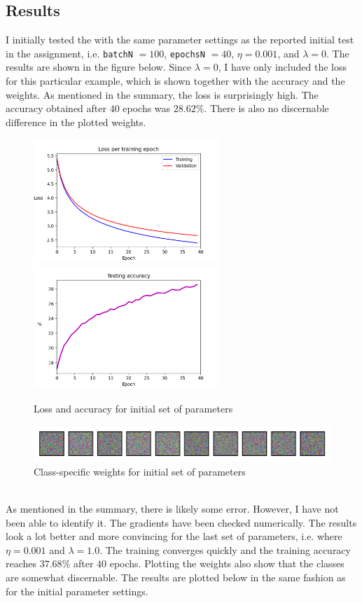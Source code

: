 \documentclass{article}
\begin{document}
\subsection*{Results}
	I initially tested the with the same parameter settings as the reported initial test in the assignment, i.e. \texttt{batchN} $=100$, \texttt{epochsN} $=40$, $\eta = 0.001$, and $\lambda = 0$. The results are shown in the figure below. Since $\lambda=0$, I have only included the loss for this particular example, which is shown together with the accuracy and the weights. As mentioned in the summary, the loss is surprisingly high. The accuracy obtained after $40$ epochs was $28.62$\%. There is also no discernable difference in the plotted weights. 
	\begin{figure}[h!]
		\centering
		\includegraphics[width=7cm]{../plots/loss_v2.png}
		\includegraphics[width=7cm]{../plots/acc_v2.png}
		\caption{Loss and accuracy for initial set of parameters}
		\vspace{0.2cm}
		\includegraphics[width=12cm]{../plots/weights_v2.png}
		\caption{Class-specific weights for initial set of parameters}
	\end{figure}\\
	As mentioned in the summary, there is likely some error. However, I have not been able to identify it. The gradients have been checked numerically. The results look a lot better and more convincing for the last set of parameters, i.e. where $\eta=0.001$ and $\lambda=1.0$. The training converges quickly and the training accuracy reaches $37.68$\% after $40$ epochs. Plotting the weights also show that the classes are somewhat discernable. The results are plotted below in the same fashion as for the initial parameter settings.
\end{document}
